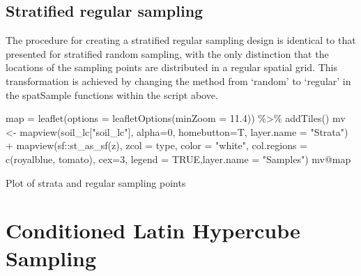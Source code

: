 \documentclass[
  10pt,
  b5paper,
  oneside]{book}
\newenvironment{Shaded}{\begin{snugshade}}{\end{snugshade}}
\newcommand{\AttributeTok}[1]{\textcolor[rgb]{0.77,0.63,0.00}{#1}}
\newcommand{\ConstantTok}[1]{\textcolor[rgb]{0.00,0.00,0.00}{#1}}
\newcommand{\DecValTok}[1]{\textcolor[rgb]{0.00,0.00,0.81}{#1}}
\newcommand{\FloatTok}[1]{\textcolor[rgb]{0.00,0.00,0.81}{#1}}
\newcommand{\FunctionTok}[1]{\textcolor[rgb]{0.00,0.00,0.00}{#1}}
\newcommand{\NormalTok}[1]{#1}
\newcommand{\OtherTok}[1]{\textcolor[rgb]{0.56,0.35,0.01}{#1}}
\newcommand{\SpecialCharTok}[1]{\textcolor[rgb]{0.00,0.00,0.00}{#1}}
\newcommand{\StringTok}[1]{\textcolor[rgb]{0.31,0.60,0.02}{#1}}
\begin{document}
\hypertarget{stratified-regular-sampling}{%
\section{Stratified regular sampling}\label{stratified-regular-sampling}}

The procedure for creating a stratified regular sampling design is identical to that presented for stratified random sampling, with the only distinction that the locations of the sampling points are distributed in a regular spatial grid. This transformation is achieved by changing the method from `random' to `regular' in the spatSample functions within the script above.

\begin{Shaded}
\begin{Highlighting}[]
\NormalTok{   map }\OtherTok{=} \FunctionTok{leaflet}\NormalTok{(}\AttributeTok{options =} \FunctionTok{leafletOptions}\NormalTok{(}\AttributeTok{minZoom =} \FloatTok{11.4}\NormalTok{)) }\SpecialCharTok{\%\textgreater{}\%}
        \FunctionTok{addTiles}\NormalTok{()}
\NormalTok{  mv }\OtherTok{\textless{}{-}} \FunctionTok{mapview}\NormalTok{(soil\_lc[}\StringTok{"soil\_lc"}\NormalTok{], }\AttributeTok{alpha=}\DecValTok{0}\NormalTok{, }\AttributeTok{homebutton=}\NormalTok{T, }\AttributeTok{layer.name =} \StringTok{"Strata"}\NormalTok{) }\SpecialCharTok{+} 
        \FunctionTok{mapview}\NormalTok{(sf}\SpecialCharTok{::}\FunctionTok{st\_as\_sf}\NormalTok{(z), }\AttributeTok{zcol =} \StringTok{\textquotesingle{}type\textquotesingle{}}\NormalTok{, }\AttributeTok{color =} \StringTok{"white"}\NormalTok{, }\AttributeTok{col.regions =} \FunctionTok{c}\NormalTok{(}\StringTok{\textquotesingle{}royalblue\textquotesingle{}}\NormalTok{, }\StringTok{\textquotesingle{}tomato\textquotesingle{}}\NormalTok{), }\AttributeTok{cex=}\DecValTok{3}\NormalTok{, }\AttributeTok{legend =} \ConstantTok{TRUE}\NormalTok{,}\AttributeTok{layer.name =} \StringTok{"Samples"}\NormalTok{)}
\NormalTok{  mv}\SpecialCharTok{@}\NormalTok{map}
\end{Highlighting}
\end{Shaded}

\label{fig:fig-14}Plot of strata and regular sampling points

\hypertarget{conditioned-latin-hypercube-sampling}{%
\chapter{Conditioned Latin Hypercube Sampling}\label{conditioned-latin-hypercube-sampling}}
\end{document}

